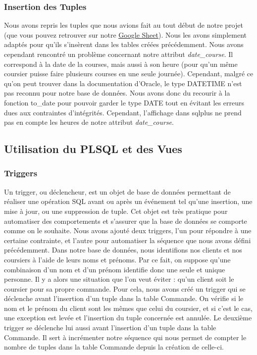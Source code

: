 \documentclass[french]{article}
\begin{document}
        \subsubsection*{Insertion des Tuples}
            Nous avons repris les tuples que nous avions fait au tout début de notre projet (que vous pouvez retrouver sur notre \href{https://docs.google.com/spreadsheets/d/1HeSNFvLN3-yMfWHoYLVumzOeQpHXJHynqVBusbvl6EQ/edit?usp=sharing}{\underline{Google Sheet}}). Nous les avons simplement adaptés pour qu'ils s'insèrent dans les tables créées précédemment.\newline
            Nous avons cependant rencontré un problème concernant notre attribut \textit{date\_course}. Il correspond à la date de la courses, mais aussi à son heure (pour qu'un même coursier puisse faire plusieurs courses en une seule journée). Cependant, malgré ce qu'on peut trouver dans la documentation d'Oracle, le type DATETIME n'est pas reconnu pour notre base de données. Nous avons donc du recourir à la fonction to\_date pour pouvoir garder le type DATE tout en évitant les erreurs dues aux contraintes d'intégrités. Cependant, l'affichage dans sqlplus ne prend pas en compte les heures de notre attribut \textit{date\_course}. 

        \subsection*{Utilisation du PLSQL et des Vues}

            \subsubsection*{Triggers}
            Un trigger, ou déclencheur, est un objet de base de données permettant de réaliser une opération SQL avant ou après un événement tel qu'une insertion, une mise à jour, ou une suppression de tuple. Cet objet est très pratique pour automatiser des comportements et s'assurer que la base de données se comporte comme on le souhaite.\newline
            Nous avons ajouté deux triggers, l'un pour répondre à une certaine contrainte, et l'autre pour automatiser la séquence que nous avons défini précédemment.\newline
            Dans notre base de données, nous identifions nos clients et nos coursiers à l'aide de leurs noms et prénoms. Par ce fait, on suppose qu'une combinaison d'un nom et d'un prénom identifie donc une seule et unique personne. Il y a alors une situation que l'on veut éviter : qu'un client soit le coursier pour sa propre commande. Pour cela, nous avons créé un trigger qui se déclenche avant l'insertion d'un tuple dans la table Commande. On vérifie si le nom et le prénom du client sont les mêmes que celui du coursier, et si c'est le cas, une exception est levée et l'insertion du tuple concernée est annulée.\newline
            Le deuxième trigger se déclenche lui aussi avant l'insertion d'un tuple dans la table Commande. Il sert à incrémenter notre séquence qui nous permet de compter le nombre de tuples dans la table Commande depuis la création de celle-ci.\newline
            
\end{document}
